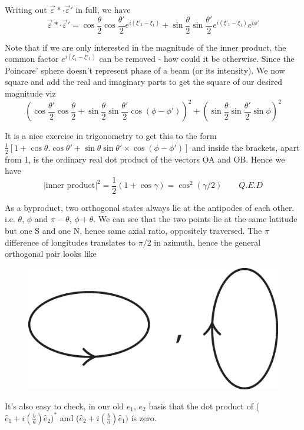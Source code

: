 Writing out $\overrightarrow{\varepsilon} \ast \cdot  \overrightarrow{\varepsilon}'$ in full, we have
$$
\overrightarrow{\varepsilon} \ast \cdot \overrightarrow{\varepsilon}' = \cos  \frac{\theta}{2} \cos \frac{\theta'}{2} e^{i (\xi'_1 - \xi_1)} + \sin \frac{\theta}{2} \sin \frac{\theta'}{2} e^{i (\xi'_1 - \xi_1)} e^{i \phi'}
$$

Note that if we are only interested in the magnitude of the inner product, the
common factor $e^{i(\xi_1 - \xi'_1)}$ can be removed - how could it be otherwise. Since the
Poincare' sphere doesn't represent phase of a beam (or its intensity). We now
square and add the real and imaginary parts to get the square of our desired
magnitude viz
$$
\left(\cos \frac{\theta'}{2} \cos \frac{\theta}{2} + \sin \frac{\theta}{2} \sin \frac{\theta'}{2} \cos (\phi - \phi') \right)^2 + (\sin \frac{\theta}{2} \sin \frac{\theta'}{2}
\sin \phi)^2
$$

It is a nice exercise in trigonometry to get this to the form $\frac{1}{2} [1 + \cos \theta . \cos \theta' +
\sin \theta \sin \theta'  \times \cos (\phi - \phi')]$ and inside the brackets, apart from 1, is the ordinary real dot product of the
vectors OA and OB. Hence we have
$$
|\text{inner product}|^2 = \frac{1}{2} (1 + \cos \gamma) = \cos^2 (\gamma/2) \qquad {Q.E.D}
$$


As a byproduct, two orthogonal states always lie at the antipodes of each
other. i.e. $\theta$, $\phi$ and $\pi - \theta$, $\phi + \theta$. We can see that the two points lie at the
same latitude but one S and one N, hence same axial ratio, oppositely traversed.
The $\pi$ difference of longitudes translates to $\pi/2$ in azimuth, hence the general
orthogonal pair looks like
\begin{figure}[H]
\centering
\includegraphics[scale=0.1]{src/images/chap26/8.eps}
\end{figure}

It's also easy to check, in our old $e_1$, $e_2$ basis that the dot product of ($\hat{e}_1 + i (\frac{b}{a}) \hat{e}_2)^{\ast}$ and ($\hat{e}_2 + i(\frac{b}{a}) \hat{e}_1)$ is zero.

